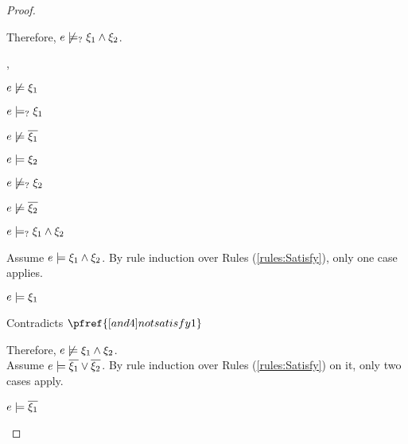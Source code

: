 \begin{proof}
\begin{byCases}
\begin{byCases}
\begin{byCases}
        \end{byCases}
        Therefore, $e \not\models_{?} \xi_1 \wedge \xi_2$.
    \item[\cmaysatisfy{e}{\xi_1},\csatisfy{e}{\xi_2}]
        \begin{pfsteps*}
        \item $e \not\models \xi_1$  
        \item $e \models_{?} \xi_1$  
        \item $e \not\models \overline{\xi_1}$  
        \item $e \models \xi_2$  
        \item $e \not\models_{?} \xi_2$  
        \item $e \not\models \overline{\xi_2}$  
        \item $e \models_{?} \xi_1 \wedge \xi_2$  
        \end{pfsteps*}
        Assume $e \models \xi_1 \wedge \xi_2$. By rule induction over Rules (\ref{rules:Satisfy}), only one case applies.
        \begin{byCases}
        \item[\text{(\ref{rule:CSAnd})}]
            \begin{pfsteps*}
            \item $e \models \xi_1$ 
            \end{pfsteps*}
            Contradicts $\pfref{[and4]notsatisfy1}$
        \end{byCases}
        Therefore, $e \not\models \xi_1 \wedge \xi_2$.\\
        Assume $e \models \overline{\xi_1} \vee \overline{\xi_2}$. By rule induction over Rules (\ref{rules:Satisfy}) on it, only two cases apply.
        \begin{byCases}
        \item[\text{(\ref{rule:CSOr1})}]
            \begin{pfsteps*}
            \item $e \models \overline{\xi_1}$ 
            \end{pfsteps*}

\end{byCases}
\end{byCases}
\end{byCases}
\end{proof}
